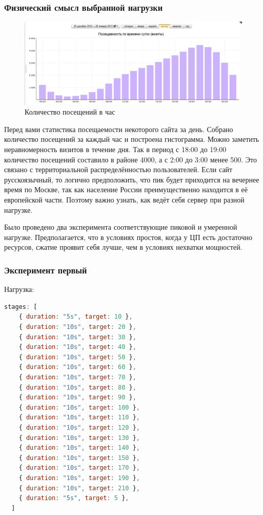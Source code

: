 \documentclass[12pt]{article}
\begin{document}
\subsubsection{ Физический смысл выбранной нагрузки }

\begin{figure}[H]
    \centering
    \includegraphics[width=1\textwidth]{../images/pedsovet.png}
    \caption{Количество посещений в час}
\end{figure}

Перед вами статистика посещаемости некоторого сайта за день. Собрано количество посещений за каждый час и построена гистограмма.
Можно заметить неравномерность визитов в течение дня. Так в период с 18:00 до 19:00 количество посещений составило в районе 4000,
а с 2:00 до 3:00 менее 500. Это связано с территориальной распределённостью пользователей.
Если сайт русскоязычный, то логично предположить, что пик будет приходится на вечернее время по Москве,
так как население России преимущественно находится в её европейской части.
Поэтому важно узнать, как ведёт себя сервер при разной нагрузке.

Было проведено два эксперимента соответствующие пиковой и умеренной нагрузке.
Предполагается, что в условиях простоя, когда у ЦП есть достаточно ресурсов,
сжатие проявит себя лучше, чем в условиях нехватки мощностей.

\subsubsection{Эксперимент первый}

Нагрузка:

\begin{lstlisting}[language=JavaScript]
  stages: [
    { duration: "5s", target: 10 },
    { duration: "10s", target: 20 },
    { duration: "10s", target: 30 },
    { duration: "10s", target: 40 },
    { duration: "10s", target: 50 },
    { duration: "10s", target: 60 },
    { duration: "10s", target: 70 },
    { duration: "10s", target: 80 },
    { duration: "10s", target: 90 },
    { duration: "10s", target: 100 },
    { duration: "10s", target: 110 },
    { duration: "10s", target: 120 },
    { duration: "10s", target: 130 },
    { duration: "10s", target: 140 },
    { duration: "10s", target: 150 },
    { duration: "10s", target: 170 },
    { duration: "10s", target: 190 },
    { duration: "10s", target: 210 },
    { duration: "5s", target: 5 },
  ]
\end{lstlisting}
\end{document}
